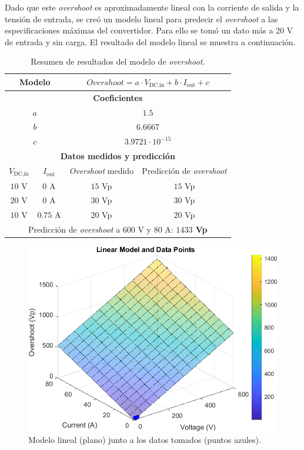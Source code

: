 Dado que este \textit{overshoot} es aproximadamente lineal con la corriente de salida y la tensión de entrada, se creó un modelo lineal para predecir el \textit{overshoot} a las especificaciones máximas del convertidor. Para ello se tomó un dato más a 20 V de entrada y sin carga. El resultado del modelo lineal se muestra a continuación.

\begin{table}[H]
	\centering
	\begin{tabular}{|c|c|c|c|}
		\hline
		\multicolumn{2}{|c|}{\textbf{Modelo}} & \multicolumn{2}{|c|}{$Overshoot = a \cdot V_{\text{DC,in}} + b \cdot I_{\text{out}} + c$} \\
		\hline
		\multicolumn{4}{|c|}{\textbf{Coeficientes}} \\
		\hline
		\multicolumn{2}{|c|}{$a$} & \multicolumn{2}{c|}{$1.5$} \\
		\multicolumn{2}{|c|}{$b$} & \multicolumn{2}{c|}{$6.6667$} \\
		\multicolumn{2}{|c|}{$c$} & \multicolumn{2}{c|}{$3.9721 \cdot 10^{-15}$} \\
		\hline
		\multicolumn{4}{|c|}{\textbf{Datos medidos y predicción}} \\
		\hline
		{$V_{\text{DC,in}}$} & $I_{\text{out}}$ & \textit{Overshoot} medido & Predicción de \textit{overshoot}\\
		\hline
		{$10$ V} & $0$ A & $15$ Vp & $15$ Vp\\
		{$20$ V} & $0$ A & $30$ Vp & $30$ Vp\\
		{$10$ V} & $0.75$ A & $20$ Vp & $20$ Vp \\
		\hline
		\multicolumn{4}{|c|}{Predicción de \textit{overshoot} a $600$ V y $80$ A: {\color{red}\textbf{$1433$ Vp}}} \\
		\hline
	\end{tabular}
	\caption{Resumen de resultados del modelo de \textit{overshoot}.}
\end{table}



\begin{figure}[H]
	\centering
	\includegraphics[width=0.7\linewidth]{fig/overshootInicial3}
	\caption{Modelo lineal (plano) junto a los datos tomados (puntos azules).}
\end{figure}

